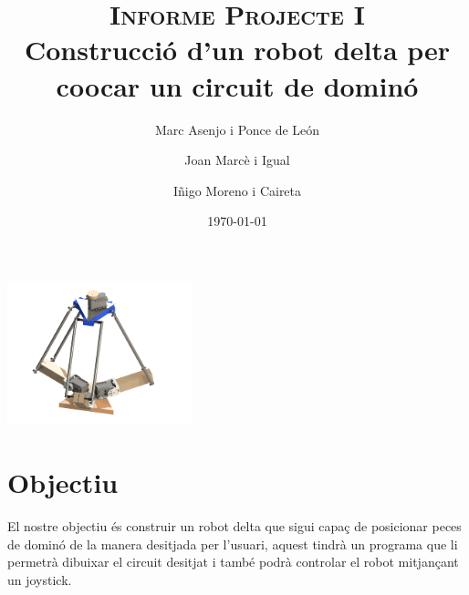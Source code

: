 \documentclass[a4paper, 12pt]{article}
\begin{document}
\title{\textsc{Informe Projecte I} \\ \large Construcció d'un robot delta per co\lgem ocar un circuit de dominó}
\author{Marc Asenjo i Ponce de León \and
		Joan Marcè i Igual \and
		Iñigo Moreno i Caireta}
\date{\today}
\maketitle
\begin{center}
\includegraphics[width=0.4\textwidth]{./imgComp/logo}
\end{center}

\newpage
\tableofcontents{}

\newpage
\section{Objectiu}
El nostre objectiu és construir un robot delta que sigui capaç de posicionar peces de dominó de la manera desitjada per l'usuari, aquest tindrà un programa que li permetrà dibuixar el circuit desitjat i també podrà controlar el robot mitjançant un joystick.

\newpage


\newpage


\newpage

\end{document}
